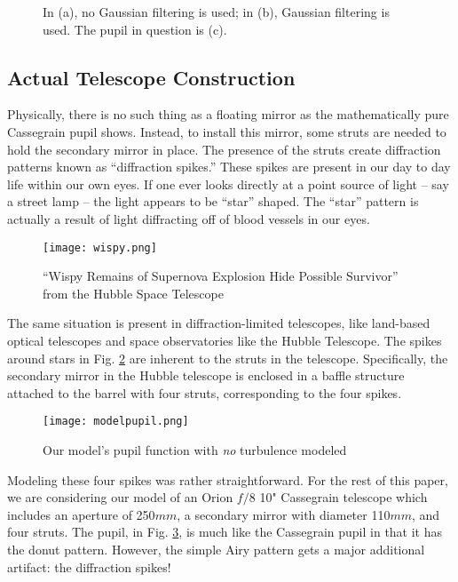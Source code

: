 \documentclass[%
 reprint,
 amsmath,amssymb,
 aps,
 pra,
]{revtex4-1}
\begin{document}
{\begin{figure}[!ht]
    \begin{minipage}{.45\textwidth}
      \centering
    \end{minipage}
    \caption{In (a), no Gaussian filtering is used; in (b), Gaussian filtering is used. The pupil in question is (c).}
    \label{fig:cassepsf-noise}
\end{figure}

\subsection{Actual Telescope Construction} \label{subsec:actual-aperture}

Physically, there is no such thing as a floating mirror as the mathematically pure Cassegrain pupil shows. Instead, to install this mirror, some struts are needed to hold the secondary mirror in place. The presence of the struts create diffraction patterns known as ``diffraction spikes.'' These spikes are present in our day to day life within our own eyes. If one ever looks directly at a point source of light -- say a street lamp -- the light appears to be ``star'' shaped. The ``star'' pattern is actually a result of light diffracting off of blood vessels in our eyes.

\begin{figure}[!ht]
    \centering
        \texttt{[image: wispy.png]}
    \caption{``Wispy Remains of Supernova Explosion Hide Possible Survivor'' from the Hubble Space Telescope}
    \label{fig:wispy}
\end{figure}

The same situation is present in diffraction-limited telescopes, like land-based optical telescopes and space observatories like the Hubble Telescope. The spikes around stars in Fig. \ref{fig:wispy} are inherent to the struts in the telescope. Specifically, the secondary mirror in the Hubble telescope is enclosed in a baffle structure attached to the barrel with four struts, corresponding to the four spikes.

\begin{figure}[!ht]
    \centering
        \texttt{[image: modelpupil.png]}
    \caption{Our model's pupil function with \textit{no} turbulence modeled}
    \label{fig:modelpupil}
\end{figure}

Modeling these four spikes was rather straightforward. For the rest of this paper, we are considering our model of an Orion $f/8$ 10" Cassegrain telescope which includes an aperture of 250$mm$, a secondary mirror with diameter 110$mm$, and four struts. The pupil, in Fig. \ref{fig:modelpupil}, is much like the Cassegrain pupil in that it has the donut pattern. However, the simple Airy pattern gets a major additional artifact: the diffraction spikes!

}
\end{document}
